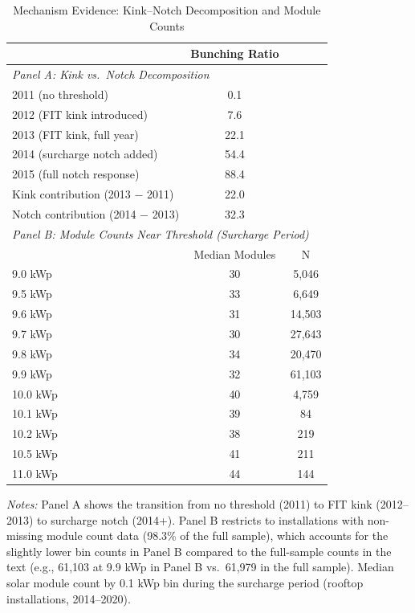 \begin{table}[t]
\centering
\caption{Mechanism Evidence: Kink--Notch Decomposition and Module Counts}
\label{tab:mechanism}
\begin{tabular}{lcc}
\toprule
 & Bunching Ratio & \\
\midrule
\multicolumn{3}{l}{\textit{Panel A: Kink vs.\ Notch Decomposition}} \\
2011 (no threshold) & 0.1 & \\
2012 (FIT kink introduced) & 7.6 & \\
2013 (FIT kink, full year) & 22.1 & \\
2014 (surcharge notch added) & 54.4 & \\
2015 (full notch response) & 88.4 & \\
\midrule
Kink contribution (2013 $-$ 2011) & 22.0 & \\
Notch contribution (2014 $-$ 2013) & 32.3 & \\
\midrule
\multicolumn{3}{l}{\textit{Panel B: Module Counts Near Threshold (Surcharge Period)}} \\
 & Median Modules & N \\
\midrule
9.0 kWp & 30 & 5,046 \\
9.5 kWp & 33 & 6,649 \\
9.6 kWp & 31 & 14,503 \\
9.7 kWp & 30 & 27,643 \\
9.8 kWp & 34 & 20,470 \\
9.9 kWp & 32 & 61,103 \\
10.0 kWp & 40 & 4,759 \\
10.1 kWp & 39 & 84 \\
10.2 kWp & 38 & 219 \\
10.5 kWp & 41 & 211 \\
11.0 kWp & 44 & 144 \\
\bottomrule
\end{tabular}
\begin{flushleft}\small \textit{Notes:} Panel A shows the transition from no threshold (2011) to FIT kink (2012--2013) to surcharge notch (2014+). Panel B restricts to installations with non-missing module count data (98.3\% of the full sample), which accounts for the slightly lower bin counts in Panel B compared to the full-sample counts in the text (e.g., 61,103 at 9.9 kWp in Panel B vs.\ 61,979 in the full sample). Median solar module count by 0.1 kWp bin during the surcharge period (rooftop installations, 2014--2020).\end{flushleft}
\end{table}

